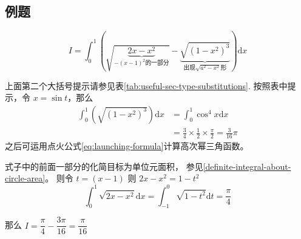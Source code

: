 \subsection{例题}

\begin{example}\label{example:w660t60}
    \[
        I = \int_0^1 \left(\sqrt{\underbrace{2x-x^2}_{-(x-1)^2\mbox{的一部分}}} 
        - \underbrace{\sqrt{(1-x^2)^3}}_{\mbox{出现}\sqrt{a^2-x^2}\mbox{形}}\right) \mathrm{d}x
    \]
    \cite[page 24, question 60]{w660}

    上面第二个大括号提示请参见表\ref{tab:useful-sec-type-substitutions}.
    按照表中提示，令 $x = \sin t$，那么
    \begin{align*}
        \int_0^1 \left(
            \sqrt{(1-x^2)^3}
        \right) \mathrm{d}x
        &=
        \int_0^1 
            \cos^4 x
        \mathrm{d}x\\
        &=
        \frac{3}{4} \times \frac{1}{2} \times \frac{\pi}{2} = \frac{3}{16} \pi
    \end{align*}
    之后可运用点火公式\ref{eq:launching-formula}计算高次幂三角函数。

    式子中的前面一部分的化简目标为单位元面积，
    参见\ref{definite-integral-about-circle-area}。
    则令 $t = (x-1)$ 则 $2x-x^2 = 1-t^2$
    \[
        \int_0^1 \sqrt{2x-x^2} \mathrm{d}x
        = 
        \int_{-1}^0 \sqrt{1-t^2} \mathrm{d}t = \frac{\pi}{4}
    \]
    
    那么 $I = \dfrac{\pi}{4} - \dfrac{3\pi}{16} = \dfrac{\pi}{16}$
\end{example}

